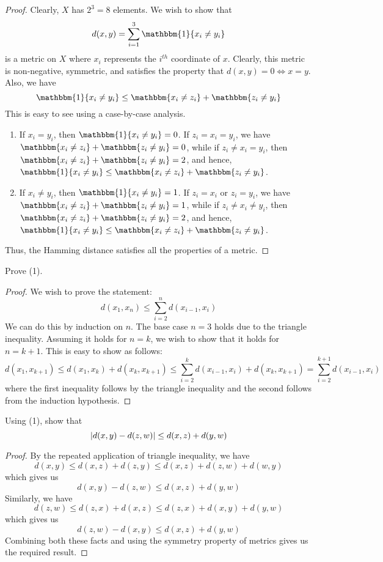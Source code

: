 {\begin{proof}
    Clearly, $X$ has $2^3 = 8$ elements. We wish to show that 
    \[d(x,y) = \sum_{i=1}^3 \mathbbm{1}\{x_i \neq y_i\}\]
    is a metric on $X$ where $x_i$ represents the $i^{th}$ coordinate of $x$. Clearly, this metric is non-negative, symmetric, and satisfies the property that $d(x,y) = 0 \iff x = y$. Also, we have
    \[\mathbbm{1}\{x_i \neq y_i\} \leq \mathbbm{x_i \neq z_i} + \mathbbm{z_i \neq y_i}\]
    This is easy to see using a case-by-case analysis. 
    \begin{enumerate}
        \item If $x_i = y_i$, then $\mathbbm{1}\{x_i \neq y_i\} = 0$. If $z_i = x_i = y_i$, we have $\mathbbm{x_i \neq z_i} + \mathbbm{z_i \neq y_i} = 0$, while if $z_i \neq x_i = y_i$, then $\mathbbm{x_i \neq z_i} + \mathbbm{z_i \neq y_i} = 2$, and hence, $\mathbbm{1}{x_i \neq y_i} \leq \mathbbm{x_i \neq z_i} + \mathbbm{z_i \neq y_i}$.
        \item If $x_i \neq y_i$, then $\mathbbm{1}\{x_i \neq y_i\} = 1$. If $z_i = x_i$ or $z_i = y_i$, we have $\mathbbm{x_i \neq z_i} + \mathbbm{z_i \neq y_i} = 1$, while if $z_i \neq x_i \neq y_i$, then $\mathbbm{x_i \neq z_i} + \mathbbm{z_i \neq y_i} = 2$, and hence, $\mathbbm{1}{x_i \neq y_i} \leq \mathbbm{x_i \neq z_i} + \mathbbm{z_i \neq y_i}$.
    \end{enumerate}
    Thus, the Hamming distance satisfies all the properties of a metric.
\end{proof}

\begin{question}
    Prove (1).
    \label{section1.1-11}
\end{question}
\begin{proof}
    We wish to prove the statement:
    \[d(x_1 , x_n) \leq  \sum_{i=2}^n d(x_{i-1} , x_i)\]
    We can do this by induction on $n$. The base case $n = 3$ holds due to the triangle inequality. Assuming it holds for $n = k$, we wish to show that it holds for $n = k+1$. This is easy to show as follows:
    \[d(x_1 , x_{k+1}) \leq d(x_1 , x_k) + d(x_k , x_{k+1}) \leq \sum_{i=2}^k d(x_{i-1} , x_{i}) + d(x_k , x_{k+1}) = \sum_{i=2}^{k+1} d(x_{i-1} , x_i)\]
    where the first inequality follows by the triangle inequality and the second follows from the induction hypothesis.
\end{proof}

\begin{question}
    Using (1), show that
    \[\left\lvert d(x,y) - d(z,w) \right\rvert \leq d(x,z) + d(y,w)\]
    \label{section1.1-12}
\end{question}
\begin{proof}
    By the repeated application of triangle inequality, we have
    \[d(x,y) \leq d(x,z) + d(z,y) \leq d(x,z) + d(z,w) + d(w,y)\]
    which gives us 
    \[d(x,y) - d(z,w) \leq d(x,z) + d(y,w)\]
    Similarly, we have
    \[d(z,w) \leq d(z,x) + d(x,z) \leq d(z,x) +  d(x,y) + d(y,w)\]
    which gives us
    \[d(z,w) - d(x,y) \leq d(x,z) + d(y,w)\]
    Combining both these facts and using the symmetry property of metrics gives us the required result.
\end{proof}

}
